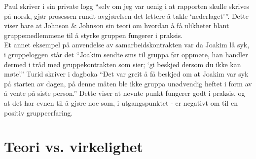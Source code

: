 Paul skriver i sin private logg ``selv om jeg var uenig i at rapporten skulle
skrives på norsk, gjør prosessen rundt avgjørelsen det lettere å takle
`nederlaget'''. Dette viser bare at Johnson \& Johnson sin teori \cite{jj} om
hvordan å få ulikheter blant gruppemedlemmene til å styrke gruppen fungerer i
praksis. \\

Et annet eksempel på anvendelse av samarbeidskontrakten var da Joakim lå syk, i
gruppeloggen står det ``Joakim sendte sms til gruppa før oppmøte, han handler
dermed i tråd med gruppekontrakten som sier; `gi beskjed dersom du ikke kan
møte'.'' Turid skriver i dagboka ``Det var greit å få beskjed om at Joakim var
syk på starten av dagen, på denne måten ble ikke gruppa unødvendig heftet i form
av å vente på siste person.'' Dette viser at nevnte punkt fungerer godt i
praksis, og at det har evnen til å gjøre noe som, i utgangspunktet - er negativt
om til en positiv gruppeerfaring.

\section{Teori vs. virkelighet}

